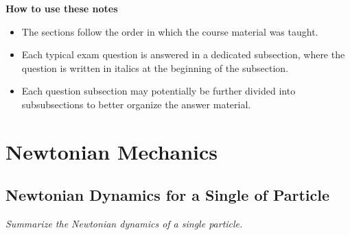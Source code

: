 \documentclass[11pt, a4paper]{article}
\begin{document}
\vspace{5mm}
\textbf{How to use these notes}
\begin{itemize}
    \item The sections follow the order in which the course material was taught.

    \item Each typical exam question is answered in a dedicated subsection, where the question is written in italics at the beginning of the subsection.
    
    \item Each question subsection may potentially be further divided into subsubsections to better organize the answer material.


\end{itemize}

\newpage

\tableofcontents

\newpage

\section{Newtonian Mechanics}

\subsection{Newtonian Dynamics for a Single of Particle}
\textit{Summarize the Newtonian dynamics of a single particle.}
\end{document}
